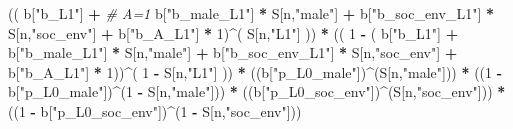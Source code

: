 \documentclass[
]{book}
\newenvironment{Shaded}{\begin{snugshade}}{\end{snugshade}}
\newcommand{\CommentTok}[1]{\textcolor[rgb]{0.56,0.35,0.01}{\textit{#1}}}
\newcommand{\DecValTok}[1]{\textcolor[rgb]{0.00,0.00,0.81}{#1}}
\newcommand{\NormalTok}[1]{#1}
\newcommand{\SpecialCharTok}[1]{\textcolor[rgb]{0.81,0.36,0.00}{\textbf{#1}}}
\newcommand{\StringTok}[1]{\textcolor[rgb]{0.31,0.60,0.02}{#1}}
\begin{document}
\begin{Shaded}
\begin{Highlighting}[]
\NormalTok{      (( b[}\StringTok{"b\_L1"}\NormalTok{] }\SpecialCharTok{+}                                                            \CommentTok{\# A=1}
\NormalTok{           b[}\StringTok{"b\_male\_L1"}\NormalTok{] }\SpecialCharTok{*}\NormalTok{ S[n,}\StringTok{"male"}\NormalTok{] }\SpecialCharTok{+}  
\NormalTok{           b[}\StringTok{"b\_soc\_env\_L1"}\NormalTok{] }\SpecialCharTok{*}\NormalTok{ S[n,}\StringTok{"soc\_env"}\NormalTok{] }\SpecialCharTok{+}
\NormalTok{           b[}\StringTok{"b\_A\_L1"}\NormalTok{] }\SpecialCharTok{*} \DecValTok{1}\NormalTok{)}\SpecialCharTok{\^{}}\NormalTok{( S[n,}\StringTok{"L1"}\NormalTok{] )) }\SpecialCharTok{*}
\NormalTok{      (( }\DecValTok{1} \SpecialCharTok{{-}}\NormalTok{ ( b[}\StringTok{"b\_L1"}\NormalTok{] }\SpecialCharTok{+}
\NormalTok{                 b[}\StringTok{"b\_male\_L1"}\NormalTok{] }\SpecialCharTok{*}\NormalTok{ S[n,}\StringTok{"male"}\NormalTok{] }\SpecialCharTok{+}  
\NormalTok{                 b[}\StringTok{"b\_soc\_env\_L1"}\NormalTok{] }\SpecialCharTok{*}\NormalTok{ S[n,}\StringTok{"soc\_env"}\NormalTok{] }\SpecialCharTok{+}
\NormalTok{                 b[}\StringTok{"b\_A\_L1"}\NormalTok{] }\SpecialCharTok{*} \DecValTok{1}\NormalTok{))}\SpecialCharTok{\^{}}\NormalTok{( }\DecValTok{1} \SpecialCharTok{{-}}\NormalTok{ S[n,}\StringTok{"L1"}\NormalTok{] )) }\SpecialCharTok{*}
\NormalTok{      ((b[}\StringTok{"p\_L0\_male"}\NormalTok{])}\SpecialCharTok{\^{}}\NormalTok{(S[n,}\StringTok{"male"}\NormalTok{])) }\SpecialCharTok{*} 
\NormalTok{      ((}\DecValTok{1} \SpecialCharTok{{-}}\NormalTok{ b[}\StringTok{"p\_L0\_male"}\NormalTok{])}\SpecialCharTok{\^{}}\NormalTok{(}\DecValTok{1} \SpecialCharTok{{-}}\NormalTok{ S[n,}\StringTok{"male"}\NormalTok{])) }\SpecialCharTok{*} 
\NormalTok{      ((b[}\StringTok{"p\_L0\_soc\_env"}\NormalTok{])}\SpecialCharTok{\^{}}\NormalTok{(S[n,}\StringTok{"soc\_env"}\NormalTok{])) }\SpecialCharTok{*}
\NormalTok{      ((}\DecValTok{1} \SpecialCharTok{{-}}\NormalTok{ b[}\StringTok{"p\_L0\_soc\_env"}\NormalTok{])}\SpecialCharTok{\^{}}\NormalTok{(}\DecValTok{1} \SpecialCharTok{{-}}\NormalTok{ S[n,}\StringTok{"soc\_env"}\NormalTok{])) }
    

\end{Highlighting}
\end{Shaded}
\end{document}
